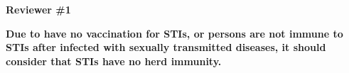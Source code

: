 \newcommand{\comment}[1]{\par\textbf{#1}\par}
\newcommand{\reply}[1]{\par{#1}\par}
\renewcommand{\quote}[1]{\par\emph{#1}\par}
\newcommand{\added}[1]{\textcolor{green!70!gray}{#1}}
\textbf{Reviewer \#1}
\comment{%
  Due to have no vaccination for STIs, or persons are not immune to STIs after infected with sexually transmitted diseases,
  it should consider that STIs have no herd immunity.}
